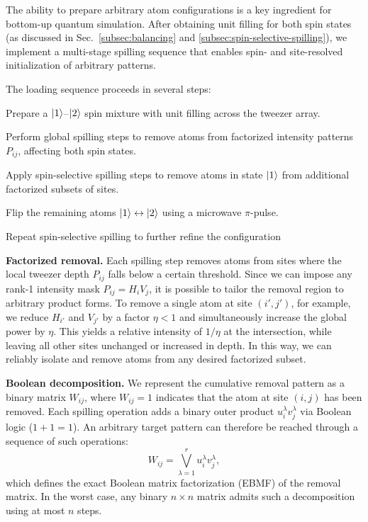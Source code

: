 
The ability to prepare arbitrary atom configurations is a key ingredient for bottom-up quantum simulation. After obtaining unit filling for both spin states (as discussed in Sec.~\ref{subsec:balancing} and \ref{subsec:spin-selective-spilling}), we implement a multi-stage spilling sequence that enables spin- and site-resolved initialization of arbitrary patterns.

The loading sequence proceeds in several steps: \vspace{-6pt}
\begin{enumerate*}
    \item Prepare a $\left| 1 \right\rangle$–$\left| 2 \right\rangle$ spin mixture with unit filling across the tweezer array.
    \item Perform global spilling steps to remove atoms from factorized intensity patterns $P_{ij}$, affecting both spin states.
    \item Apply spin-selective spilling steps to remove atoms in state $\left| 1 \right\rangle$ from additional factorized subsets of sites.
    \item Flip the remaining atoms $\left| 1 \right\rangle \leftrightarrow \left| 2 \right\rangle$ using a microwave $\pi$-pulse.
    \item Repeat spin-selective spilling to further refine the configuration
\end{enumerate*}

\textbf{Factorized removal.}
Each spilling step removes atoms from sites where the local tweezer depth $P_{ij}$ falls below a certain threshold. Since we can impose any rank-1 intensity mask $P_{ij} = H_i V_j$, it is possible to tailor the removal region to arbitrary product forms. To remove a single atom at site $(i', j')$, for example, we reduce $H_{i'}$ and $V_{j'}$ by a factor $\eta < 1$ and simultaneously increase the global power by $\eta$. This yields a relative intensity of $1/\eta$ at the intersection, while leaving all other sites unchanged or increased in depth. In this way, we can reliably isolate and remove atoms from any desired factorized subset.

\textbf{Boolean decomposition.}
We represent the cumulative removal pattern as a binary matrix $W_{ij}$, where $W_{ij} = 1$ indicates that the atom at site $(i, j)$ has been removed. Each spilling operation adds a binary outer product $u^\lambda_i v^\lambda_j$ via Boolean logic ($1 + 1 = 1$). An arbitrary target pattern can therefore be reached through a sequence of such operations:
\begin{equation}
    \label{eq:ebmf}
    W_{ij} = \bigvee_{\lambda=1}^{r} u^\lambda_i v^\lambda_j,
\end{equation}
which defines the exact Boolean matrix factorization (EBMF) of the removal matrix. In the worst case, any binary $n \times n$ matrix admits such a decomposition using at most $n$ steps.

